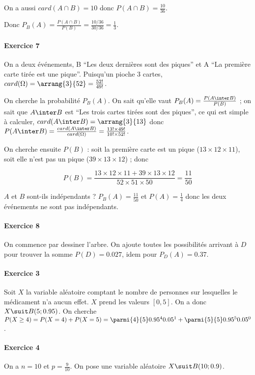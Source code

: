 \documentclass[10pt,a4paper,french]{article}
\begin{document}
On a aussi $card(A \cap B)=10$ donc $P(A \cap B)=\frac{10}{36}$.

Donc $P_B(A) = \frac{P(A \cap B)}{P(B)} = \frac{10 / 36}{30 / 36} = \frac{1}{3}$.

\paragraph{Exercice 7}
On a deux événements, B ``Les deux dernières sont des piques'' et A ``La première carte tirée est une pique''. Puisqu'un pioche 3 cartes, $card(\Omega) = \arrang{3}{52} = \frac{52!}{49!}$.

On cherche la probabilité $P_B(A)$. On sait qu'elle vaut $P_B(A) = \frac{P(A \inter B)}{P(B)}$ ; on sait que $A \inter B$ est ``Les trois cartes tirées sont des piques'', ce qui est simple à calculer, $card(A\inter B) = \arrang{3}{13}$ donc $P(A\inter B) = \frac{card(A\inter B)}{card(\Omega)} = \frac{13! \times 49!}{10! \times 52!}$.

On cherche ensuite $P(B)$ : soit la première carte est un pique ($13 \times 12 \times 11$), soit elle n'est pas un pique ($39 \times 13 \times 12$) ; donc

\[
P(B) = \frac{13 \times 12 \times 11 + 39 \times 13 \times 12}{52 \times 51 \times 50} = \frac{11}{50}
\]

$A$ et $B$ sont-ils indépendants ? $P_B(A)=\frac{11}{50}$ et $P(A)=\frac{1}{4}$ donc les deux événements ne sont pas indépendants.

\paragraph{Exercice 8}
On commence par dessiner l'arbre. On ajoute toutes les possibilités arrivant à $D$ pour trouver la somme $P(D)=0.027$, idem pour $P_D(A)=0.37$.

\paragraph{Exercice 3}
Soit $X$ la variable aléatoire comptant le nombre de personnes sur lesquelles le médicament n'a aucun effet. $X$ prend les valeurs $[0, 5]$. On a donc $X \suit B(5; 0.95)$. On cherche $P(X \geq 4) = P(X = 4) + P(X = 5) = \parmi{4}{5} 0.95^4 0.05^1 + \parmi{5}{5} 0.95^5 0.05^0$.

\paragraph{Exercice 4}
On a $n = 10$ et $p = \frac{9}{10}$. On pose une variable aléatoire $X \suit B(10; 0.9)$.
\end{document}
